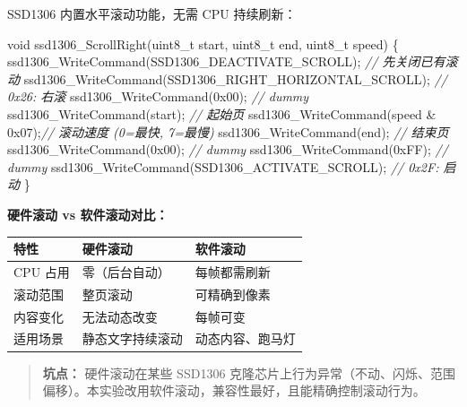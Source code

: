 \documentclass[
  chinese,
  UTF8,
  oneside,
  openany]{ctexbook}
\newenvironment{Shaded}{}{}
\newcommand{\BaseNTok}[1]{\textcolor[rgb]{0.25,0.63,0.44}{#1}}
\newcommand{\CommentTok}[1]{\textcolor[rgb]{0.38,0.63,0.69}{\textit{#1}}}
\newcommand{\DataTypeTok}[1]{\textcolor[rgb]{0.56,0.13,0.00}{#1}}
\newcommand{\NormalTok}[1]{#1}
\newcommand{\OperatorTok}[1]{\textcolor[rgb]{0.40,0.40,0.40}{#1}}
\begin{document}
SSD1306 内置水平滚动功能，无需 CPU 持续刷新：

\begin{Shaded}
\begin{Highlighting}[]
\DataTypeTok{void}\NormalTok{ ssd1306\_ScrollRight}\OperatorTok{(}\DataTypeTok{uint8\_t}\NormalTok{ start}\OperatorTok{,} \DataTypeTok{uint8\_t}\NormalTok{ end}\OperatorTok{,} \DataTypeTok{uint8\_t}\NormalTok{ speed}\OperatorTok{)}
\OperatorTok{\{}
\NormalTok{    ssd1306\_WriteCommand}\OperatorTok{(}\NormalTok{SSD1306\_DEACTIVATE\_SCROLL}\OperatorTok{);}      \CommentTok{// 先关闭已有滚动}
\NormalTok{    ssd1306\_WriteCommand}\OperatorTok{(}\NormalTok{SSD1306\_RIGHT\_HORIZONTAL\_SCROLL}\OperatorTok{);} \CommentTok{// 0x26: 右滚}
\NormalTok{    ssd1306\_WriteCommand}\OperatorTok{(}\BaseNTok{0x00}\OperatorTok{);}        \CommentTok{// dummy}
\NormalTok{    ssd1306\_WriteCommand}\OperatorTok{(}\NormalTok{start}\OperatorTok{);}       \CommentTok{// 起始页}
\NormalTok{    ssd1306\_WriteCommand}\OperatorTok{(}\NormalTok{speed }\OperatorTok{\&} \BaseNTok{0x07}\OperatorTok{);}\CommentTok{// 滚动速度 (0=最快, 7=最慢)}
\NormalTok{    ssd1306\_WriteCommand}\OperatorTok{(}\NormalTok{end}\OperatorTok{);}         \CommentTok{// 结束页}
\NormalTok{    ssd1306\_WriteCommand}\OperatorTok{(}\BaseNTok{0x00}\OperatorTok{);}        \CommentTok{// dummy}
\NormalTok{    ssd1306\_WriteCommand}\OperatorTok{(}\BaseNTok{0xFF}\OperatorTok{);}        \CommentTok{// dummy}
\NormalTok{    ssd1306\_WriteCommand}\OperatorTok{(}\NormalTok{SSD1306\_ACTIVATE\_SCROLL}\OperatorTok{);} \CommentTok{// 0x2F: 启动}
\OperatorTok{\}}
\end{Highlighting}
\end{Shaded}

\textbf{硬件滚动 vs 软件滚动对比：}

\begin{longtable}[]{@{}lll@{}}
\toprule\noalign{}
特性 & 硬件滚动 & 软件滚动 \\
\midrule\noalign{}
\endhead
\bottomrule\noalign{}
\endlastfoot
CPU 占用 & 零（后台自动） & 每帧都需刷新 \\
滚动范围 & 整页滚动 & 可精确到像素 \\
内容变化 & 无法动态改变 & 每帧可变 \\
适用场景 & 静态文字持续滚动 & 动态内容、跑马灯 \\
\end{longtable}

\begin{quote}
\textbf{坑点：} 硬件滚动在某些 SSD1306
克隆芯片上行为异常（不动、闪烁、范围偏移）。本实验改用软件滚动，兼容性最好，且能精确控制滚动行为。
\end{quote}
\end{document}
